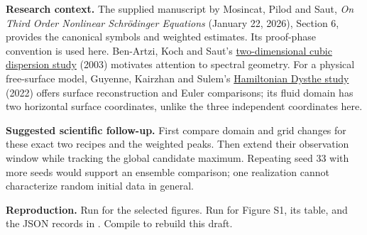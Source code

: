 \documentclass[10pt,letterpaper]{article}
\begin{document}
\textbf{Research context.} The supplied manuscript by Mosincat, Pilod and Saut,
\emph{On Third Order Nonlinear Schr\"odinger Equations} (January 22, 2026),
Section 6, provides the canonical symbols and weighted estimates. Its proof-phase
convention is used here. Ben-Artzi, Koch and Saut's
\href{https://doi.org/10.1081/PDE-120025491}{two-dimensional cubic dispersion study}
(2003) motivates attention to spectral geometry. For a physical free-surface model,
Guyenne, Kairzhan and Sulem's
\href{https://arxiv.org/abs/2108.10822}{Hamiltonian Dysthe study} (2022) offers
surface reconstruction and Euler comparisons; its fluid domain has two horizontal
surface coordinates, unlike the three independent coordinates here.

\textbf{Suggested scientific follow-up.} First compare domain and grid changes
for these exact two recipes and the weighted peaks. Then extend their observation
window while tracking the global candidate maximum. Repeating seed 33 with more
seeds would support an ensemble comparison; one realization cannot characterize
random initial data in general.

\begingroup\raggedright\textbf{Reproduction.} Run  for the selected figures.
Run  for Figure S1, its table, and the
JSON records in . Compile
 to rebuild this draft.\par\endgroup
\end{document}
